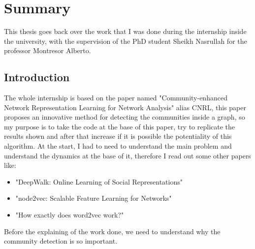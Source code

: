 %
%
%
\chapter{Summary}
This thesis goes back over the work that I was done during the internship inside the university, with the supervision of the PhD student Sheikh Nasrullah for the professor Montresor Alberto.
%
\section{Introduction}
The whole internship is based on the paper named "Community-enhanced Network Representation Learning for Network Analysis" alias CNRL, this paper proposes an innovative method for detecting the communities inside a graph, so my purpose is to take the code at the base of this paper, try to replicate the results shown and after that increase if it is possible the potentiality of this algorithm.\newline
At the start, I had to need to understand the main problem and understand the dynamics at the base of it, therefore I read out some other papers like:
\begin{itemize}
	\item "DeepWalk: Online Learning of Social Representations"
	\item "node2vec: Scalable Feature Learning for Networks"
	\item "How exactly does word2vec work?"
\end{itemize} 
Before the explaining of the work done, we need to understand why the community detection is so important.
%
